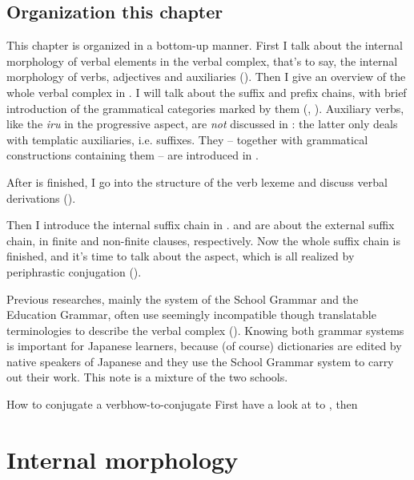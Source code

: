 \documentclass[UTF8, a4paper, oneside, scheme=plain]{ctexrep}
\newcommand{\corpus}[1]{\emph{#1}}
\begin{document}
\subsection{Organization this chapter}

This chapter is organized in a bottom-up manner.
First I talk about the internal morphology of verbal elements in the verbal complex,
that's to say, the internal morphology of verbs, adjectives and auxiliaries 
().
Then I give an overview of the whole verbal complex in . 
I will talk about the suffix and prefix chains,
with brief introduction of the grammatical categories marked by them
(, ).
Auxiliary verbs, like the \corpus{iru} in the progressive aspect,
are \emph{not} discussed in :
the latter only deals with templatic auxiliaries, i.e. suffixes.
They -- together with grammatical constructions containing them -- 
are introduced in .

After  is finished,
I go into the structure of the verb lexeme and discuss verbal derivations ().

Then I introduce the internal suffix chain in .
 and  
are about the external suffix chain,
in finite and non-finite clauses, respectively.
Now the whole suffix chain is finished, and it's time to talk about the aspect,
which is all realized by periphrastic conjugation ().

Previous researches, mainly the system of the School Grammar and the Education Grammar,
often use seemingly incompatible though translatable terminologies 
to describe the verbal complex ().
Knowing both grammar systems is important for Japanese learners,
because (of course) dictionaries are edited by native speakers of Japanese
and they use the School Grammar system to carry out their work.
This note is a mixture of the two schools.

\begin{learnbox}{How to conjugate a verb}{how-to-conjugate}
    First have a look at  to ,
    then 
\end{learnbox}

\section{Internal morphology}\label{sec:conjugation-class}
\end{document}
